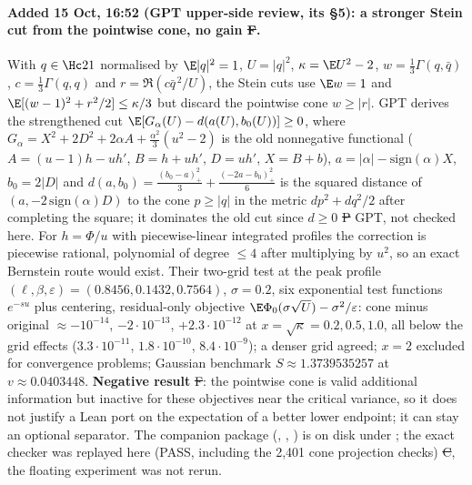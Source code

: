 \paragraph{Added 15 Oct, 16:52 (GPT upper-side review, its \S5): a stronger Stein cut from the pointwise cone, no gain \st{F}.}\label{sec:conecut}
With $q\in\Hc21$ normalised by $\E|q|^2=1$, $U=|q|^2$, $\kappa=\E U^2-2$, $w=\frac13\Gamma(q,\bar q)$, $c=\frac13\Gamma(q,q)$ and
$r=\Re(c\bar q^{\,2}/U)$, the Stein cuts use $\E w=1$ and $\E[(w-1)^2+r^2/2]\le\kappa/3$ but discard the pointwise cone $w\ge|r|$. GPT derives
the strengthened cut $\E[G_\alpha(U)-d(a(U),b_0(U))]\ge0$, where $G_\alpha=X^2+2D^2+2\alpha A+\frac{\alpha^2}3(u^2-2)$ is the old nonnegative
functional ($A=(u-1)h-uh'$, $B=h+uh'$, $D=uh'$, $X=B+b$), $a=|\alpha|-\mathrm{sign}(\alpha)X$, $b_0=2|D|$ and
$d(a,b_0)=\frac{(b_0-a)_+^2}3+\frac{(-2a-b_0)_+^2}6$ is the squared distance of $(a,-2\,\mathrm{sign}(\alpha)D)$ to the cone $p\ge|q|$ in the
metric $dp^2+dq^2/2$ after completing the square; it dominates the old cut since $d\ge0$ \st{P} GPT, not checked here. For $h=\Phi/u$ with
piecewise-linear integrated profiles the correction is piecewise rational, polynomial of degree $\le4$ after multiplying by $u^2$, so an exact
Bernstein route would exist. Their two-grid test at the peak profile $(\ell,\beta,\varepsilon)=(0.8456,0.1432,0.7564)$, $\sigma=0.2$, six
exponential test functions $e^{-su}$ plus centering, residual-only objective $\E\Phi_0(\sigma\sqrt U)-\sigma^2/\varepsilon$: cone minus original
$\approx-10^{-14}$, $-2\cdot10^{-13}$, $+2.3\cdot10^{-12}$ at $x=\sqrt\kappa=0.2,0.5,1.0$, all below the grid effects ($3.3\cdot10^{-11}$,
$1.8\cdot10^{-10}$, $8.4\cdot10^{-9}$); a denser grid agreed; $x=2$ excluded for convergence problems; Gaussian benchmark $S\approx1.3739535257$ at
$v\approx0.0403448$. \textbf{Negative result} \st{F}: the pointwise cone is valid additional information but inactive for these objectives near the
critical variance, so it does not justify a Lean port on the expectation of a better lower endpoint; it can stay an optional separator. The
companion package (, , ) is on disk under
; the exact checker was replayed here (PASS, including the 2,401 cone
projection checks) \st{C}, the floating experiment was not rerun.

